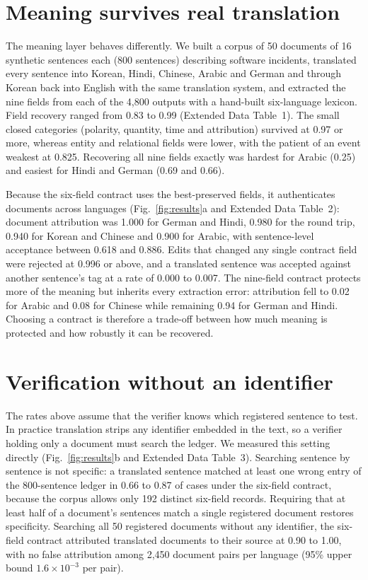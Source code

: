 \documentclass[12pt]{article}
\begin{document}
\section*{Meaning survives real translation}

The meaning layer behaves differently. We built a corpus of 50 documents of 16 synthetic sentences each (800 sentences) describing software incidents, translated every sentence into Korean, Hindi, Chinese, Arabic and German and through Korean back into English with the same translation system, and extracted the nine fields from each of the 4,800 outputs with a hand-built six-language lexicon. Field recovery ranged from 0.83 to 0.99 (Extended Data Table~1). The small closed categories (polarity, quantity, time and attribution) survived at 0.97 or more, whereas entity and relational fields were lower, with the patient of an event weakest at 0.825. Recovering all nine fields exactly was hardest for Arabic (0.25) and easiest for Hindi and German (0.69 and 0.66).

Because the six-field contract uses the best-preserved fields, it authenticates documents across languages (Fig.~\ref{fig:results}a and Extended Data Table~2): document attribution was 1.000 for German and Hindi, 0.980 for the round trip, 0.940 for Korean and Chinese and 0.900 for Arabic, with sentence-level acceptance between 0.618 and 0.886. Edits that changed any single contract field were rejected at 0.996 or above, and a translated sentence was accepted against another sentence's tag at a rate of 0.000 to 0.007. The nine-field contract protects more of the meaning but inherits every extraction error: attribution fell to 0.02 for Arabic and 0.08 for Chinese while remaining 0.94 for German and Hindi. Choosing a contract is therefore a trade-off between how much meaning is protected and how robustly it can be recovered.

\section*{Verification without an identifier}

The rates above assume that the verifier knows which registered sentence to test. In practice translation strips any identifier embedded in the text, so a verifier holding only a document must search the ledger. We measured this setting directly (Fig.~\ref{fig:results}b and Extended Data Table~3). Searching sentence by sentence is not specific: a translated sentence matched at least one wrong entry of the 800-sentence ledger in 0.66 to 0.87 of cases under the six-field contract, because the corpus allows only 192 distinct six-field records. Requiring that at least half of a document's sentences match a single registered document restores specificity. Searching all 50 registered documents without any identifier, the six-field contract attributed translated documents to their source at 0.90 to 1.00, with no false attribution among 2,450 document pairs per language (95\% upper bound $1.6\times10^{-3}$ per pair).
\end{document}
